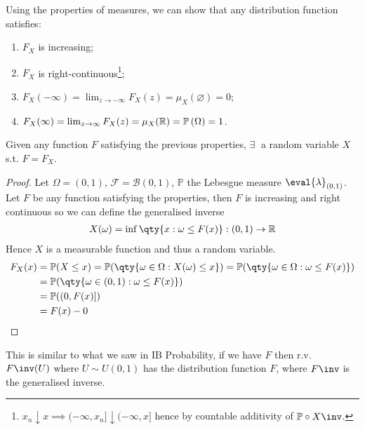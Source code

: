 Using the properties of measures, we can show that any distribution function satisfies:

\begin{enumerate}
	\item $F_X$ is increasing;
	\item $F_X$ is right-continuous\footnote{$x_n \downarrow x \implies (-\infty, x_n] \downarrow (-\infty, x]$ hence by countable additivity of $\mathbb{P} \circ X\inv$.};
	\item $F_X(-\infty) = \lim_{z \to -\infty} F_X(z) = \mu_X(\varnothing) = 0$;
	\item $F_X(\infty) = \lim_{z \to \infty} F_X(z) = \mu_X(\mathbb R) = \mathbb{P}\left({\Omega}\right) = 1$.
\end{enumerate}

\begin{proposition}
	Given any function $F$ satisfying the previous properties, $\exists \;$ a random variable $X$ s.t. $F = F_X$.
\end{proposition}

\begin{proof}
	Let $\Omega = (0, 1)$, $\mathcal{F} = \mathcal{B}(0, 1)$, $\mathbb{P}$ the Lebesgue measure $\eval{\lambda}_{(0, 1)}$. \\
	Let $F$ be any function satisfying the properties, then $F$ is increasing and right continuous so we can define the generalised inverse
	\begin{align*}
		X(\omega) = \inf\qty{x : \omega \leq F(x)} : (0, 1) \to \mathbb{R}
	\end{align*}
	Hence $X$ is a measurable function and thus a random variable.
	\begin{align*}
		F_X(x) &= \mathbb{P}(X \leq x) = \mathbb{P}(\qty{\omega \in \Omega : X(\omega) \leq x}) = \mathbb{P}(\qty{\omega \in \Omega : \omega \leq F(x)}) \\
		&= \mathbb{P}(\qty{\omega \in (0, 1) : \omega \leq F(x)}) \\
		&= \mathbb{P}((0, F(x)]) \\
		&= F(x) - 0
	\end{align*}
\end{proof}

\begin{remark}
	This is similar to what we saw in IB Probability, if we have $F$ then r.v. $F\inv(U)$ where $U \sim U(0, 1)$ has the distribution function $F$, where $F\inv$ is the generalised inverse.
\end{remark}

